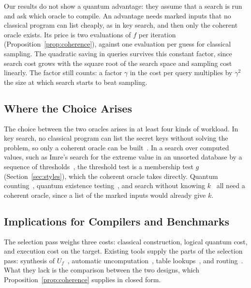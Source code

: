 \documentclass[journal]{IEEEtran}
\begin{document}
Our results do not show a quantum advantage: they assume that a search is run
and ask which oracle to compile. An advantage
needs marked inputs that no classical program can list cheaply, as in key
search, and then only the coherent oracle exists. Its price is two evaluations
of $f$ per iteration (Proposition~\ref{prop:coherence}), against one evaluation
per guess for classical sampling. The quadratic saving in queries survives this
constant factor, since search cost grows with the square root of the search
space and sampling cost linearly. The factor still counts: a factor $\gamma$ in
the cost per query multiplies by $\gamma^2$ the size at which search starts to
beat sampling.

\subsection{Where the Choice Arises}
\label{sec:applications}

The choice between the two oracles arises in at least four kinds of workload.
In key search, no classical program can list the secret keys without solving the
problem, so only a coherent oracle can be
built~\cite{leander2017grover,jaques2020implementing}. In a search over computed values, such as
Imre's search for the extreme value in an unsorted database by a sequence of
thresholds~\cite{imre2007quantum}, the threshold test is a membership test $g$
(Section~\ref{sec:styles}), which the coherent oracle takes directly. Quantum
counting~\cite{brassard2002amplitude}, quantum existence
testing~\cite{imre2007quantum}, and search without knowing
$k$~\cite{boyer1998tight} all need a coherent oracle, since a list of the marked
inputs would already give $k$.

\subsection{Implications for Compilers and Benchmarks}
\label{sec:computing}

The selection pass weighs three costs: classical construction, logical quantum
cost, and execution cost on the target. Existing tools supply the parts of the selection pass: synthesis of
$U_f$~\cite{soeken2019lut,bernasconi2023xor}, automatic
uncomputation~\cite{paradis2021unqomp}, table lookups~\cite{babbush2018encoding},
and routing~\cite{li2019tackling,tan2021optimality}. What they lack is the
comparison between the two designs, which Proposition~\ref{prop:coherence}
supplies in closed form.
\end{document}
